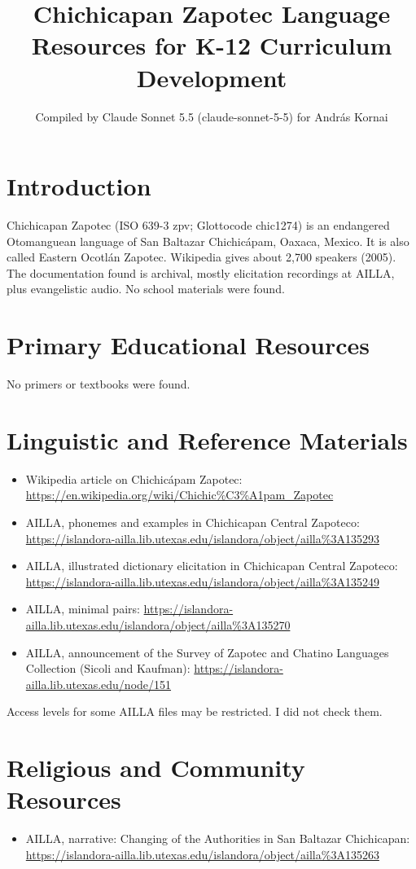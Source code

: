 \documentclass[12pt]{article}
\title{Chichicapan Zapotec Language Resources for K-12 Curriculum Development}
\author{Compiled by Claude Sonnet 5.5 (claude-sonnet-5-5) for Andr\'as Kornai}
\date{}
\begin{document}
\maketitle

\section{Introduction}
Chichicapan Zapotec (ISO 639-3 zpv; Glottocode chic1274) is an endangered Otomanguean language of San Baltazar Chichic\'apam, Oaxaca, Mexico. It is also called Eastern Ocotl\'an Zapotec. Wikipedia gives about 2,700 speakers (2005). The documentation found is archival, mostly elicitation recordings at AILLA, plus evangelistic audio. No school materials were found.

\section{Primary Educational Resources}
No primers or textbooks were found.

\section{Linguistic and Reference Materials}
\begin{itemize}
\item Wikipedia article on Chichic\'apam Zapotec: \url{https://en.wikipedia.org/wiki/Chichic%C3%A1pam_Zapotec}
\item AILLA, phonemes and examples in Chichicapan Central Zapoteco: \url{https://islandora-ailla.lib.utexas.edu/islandora/object/ailla%3A135293}
\item AILLA, illustrated dictionary elicitation in Chichicapan Central Zapoteco: \url{https://islandora-ailla.lib.utexas.edu/islandora/object/ailla%3A135249}
\item AILLA, minimal pairs: \url{https://islandora-ailla.lib.utexas.edu/islandora/object/ailla%3A135270}
\item AILLA, announcement of the Survey of Zapotec and Chatino Languages Collection (Sicoli and Kaufman): \url{https://islandora-ailla.lib.utexas.edu/node/151}
\end{itemize}
Access levels for some AILLA files may be restricted. I did not check them.

\section{Religious and Community Resources}
\begin{itemize}
\item AILLA, narrative: Changing of the Authorities in San Baltazar Chichicapan: \url{https://islandora-ailla.lib.utexas.edu/islandora/object/ailla%3A135263}
\end{itemize}
\end{document}
